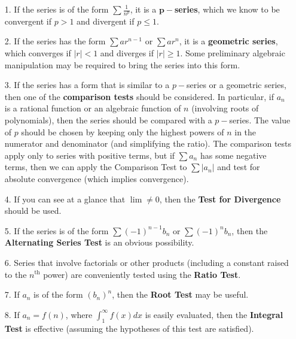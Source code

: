 \documentclass[paper=a4, fontsize=11pt]{scrartcl} %
\numberwithin{equation}{section} %
\numberwithin{figure}{section} %
\numberwithin{table}{section} %
\newcommand{\ds}{\displaystyle}
\begin{document}
\begin{enumerate}
\item[1.] If the series is of the form $\ds\sum \ds\frac{1}{n^p}$, it is a $\mathbf{p-}$\textbf{series}, which we know to be convergent if $p>1$ and divergent if $p\leq 1$.\\
\indent

\item[2.] If the series has the form $\ds\sum a r^{n-1}$ or $\ds\sum a r^n$, it is a \textbf{geometric series}, which converges if $|r|<1$ and diverges if $|r|\geq 1$. Some preliminary algebraic manipulation may be required to bring the series into this form.\\
\indent

\item[3.] If the series has a form that is similar to a $p-$series or a geometric series, then one of the \textbf{comparison tests} should be considered. In particular, if $a_n$ is a rational function or an algebraic function of $n$ (involving roots of polynomials), then the series should be compared with a $p-$series. The value of $p$ should be chosen by keeping only the highest powers of $n$ in the numerator and denominator (and simplifying the ratio). The comparison tests apply only to series with positive terms, but if $\ds\sum a_n$ has some negative terms, then we can apply the Comparison Test to $\ds\sum |a_n|$ and test for absolute convergence (which implies convergence).\\
\indent

\item[4.] If you can see at a glance that $\ds\lim\neq 0$, then the \textbf{Test for Divergence} should be used.\\
\indent

\item[5.] If the series is of the form $\ds\sum (-1)^{n-1}b_n$ or $\ds\sum (-1)^n b_n$, then the \textbf{Alternating Series Test} is an obvious possibility.\\
\indent

\item[6.] Series that involve factorials or other products (including a constant raised to the $n^{\text{th}}$ power) are conveniently tested using the \textbf{Ratio Test}.\\
\indent

\item[7.] If $a_n$ is of the form $(b_n)^n$, then the \textbf{Root Test} may be useful.\\
\indent

\item[8.] If $a_n=f(n)$, where $\ds\int_1^\infty f(x) dx$ is easily evaluated, then the \textbf{Integral Test} is effective (assuming the hypotheses of this test are satisfied).\\
\indent

\end{enumerate}
\end{document}
